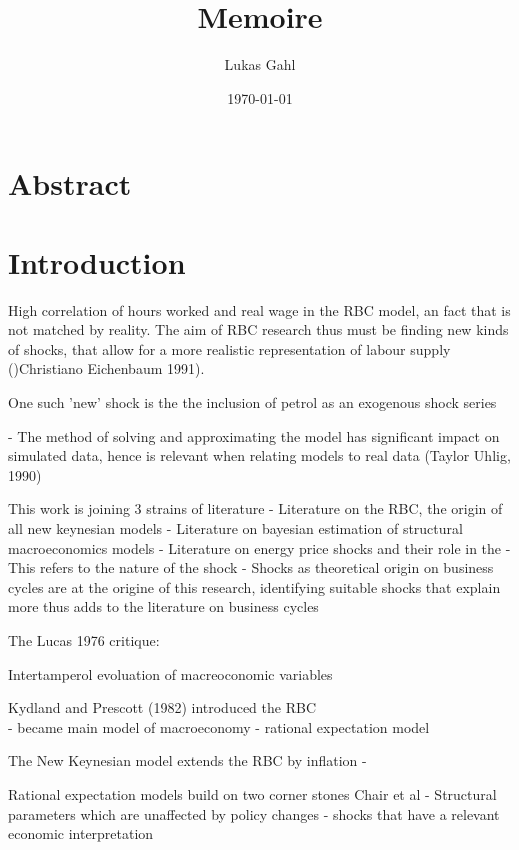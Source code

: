 \documentclass[12pt,a4paper,english]{article} %
\author{Lukas Gahl}
\title{\textbf{\huge Memoire }\\}
\date{\today}
\let\oldsection\section
\renewcommand\section{\clearpage\oldsection}
\begin{document}
	
	
	\maketitle
	\pagebreak

	\section*{Abstract}
	\pagebreak

	
	\tableofcontents
	\pagebreak
	
	
	 \section{Introduction}
	 
	 High correlation of hours worked and real wage in the RBC model, an fact that is not matched by reality. The aim of RBC research thus must be finding new kinds of shocks, that allow for a more realistic representation of labour supply ()Christiano Eichenbaum 1991).
	 
	 One such 'new' shock is the the inclusion of petrol as an exogenous shock series \cite{kim_role_1992}
	 
	 
	- The method of solving and approximating the model has significant impact on simulated data, hence is relevant when relating models to real data (Taylor  Uhlig, 1990)
	
	This work is joining 3 strains of literature
	- Literature on the RBC, the origin of all new keynesian models
	- Literature on bayesian estimation of structural macroeconomics models
	- Literature on energy price shocks and their role in the 
		- This refers to the nature of the shock
		- Shocks as theoretical origin on business cycles are at the origine of this research, 
		identifying suitable shocks that explain more thus adds to the literature on business cycles
	
	The Lucas 1976 critique: 
	
	Intertamperol evoluation of macreoconomic variables
	
	Kydland and Prescott (1982) introduced the RBC \\
	- became main model of macroeconomy
	- rational expectation model
	
	The New Keynesian model extends the RBC by inflation
	- 
	
	Rational expectation models build on two corner stones Chair et al
	- Structural parameters which are unaffected by policy changes
	- shocks that have a relevant economic interpretation
	
\end{document}
